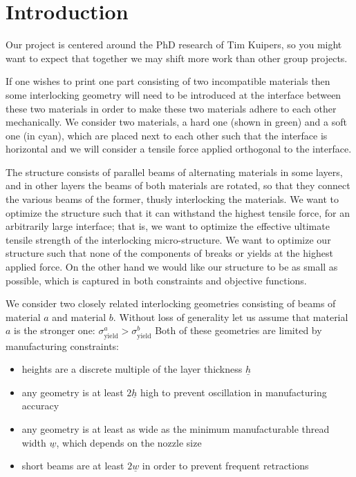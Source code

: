 \section{Introduction}
Our project is centered around the PhD research of Tim Kuipers, so you might want to expect that together we may shift more work than other group projects.

\medskip

If one wishes to print one part consisting of two incompatible materials then some interlocking geometry will need to be introduced at the interface between these two materials in order to make these two materials adhere to each other mechanically.
We consider two materials, a hard one (shown in green) and a soft one (in cyan), which are placed next to each other such that the interface is horizontal
and we will consider a tensile force applied orthogonal to the interface.

The structure consists of parallel beams of alternating materials in some layers, and in other layers the beams of both materials are rotated, so that they connect the various beams of the former, thusly interlocking the materials.
We want to optimize the structure such that it can withstand the highest tensile force, for an arbitrarily large interface;
that is, we want to optimize the effective ultimate tensile strength of the interlocking micro-structure.
We want to optimize our structure such that none of the components of breaks or yields at the highest applied force.
On the other hand we would like our structure to be as small as possible, which is captured in both constraints and objective functions.

\newcommand{\hmin}{\underline{h}}
\newcommand{\wmin}{\underline{w}}
\newcommand{\lmax}{\overline{l}}

We consider two closely related interlocking geometries consisting of beams of material $a$ and material $b$.
Without loss of generality let us assume that material $a$ is the stronger one: $\sigma^a_\text{yield} > \sigma^b_\text{yield} $
Both of these geometries are limited by manufacturing constraints:
\begin{itemize}
	\item heights are a discrete multiple of the layer thickness $\hmin$
	\item any geometry is at least $2\hmin$ high to prevent oscillation in manufacturing accuracy
	\item any geometry is at least as wide as the minimum manufacturable thread width $\wmin$, which depends on the nozzle size
	\item short beams are at least $2\wmin$ in order to prevent frequent retractions
\end{itemize}

